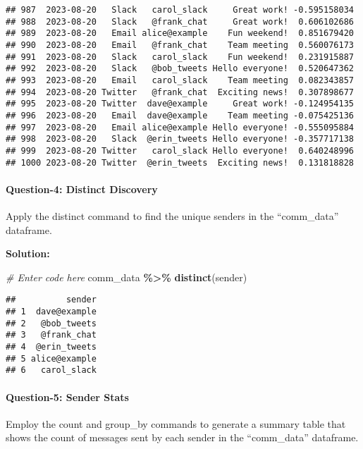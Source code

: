 \documentclass[
]{article}
\newenvironment{Shaded}{\begin{snugshade}}{\end{snugshade}}
\newcommand{\CommentTok}[1]{\textcolor[rgb]{0.56,0.35,0.01}{\textit{#1}}}
\newcommand{\FunctionTok}[1]{\textcolor[rgb]{0.13,0.29,0.53}{\textbf{#1}}}
\newcommand{\NormalTok}[1]{#1}
\newcommand{\SpecialCharTok}[1]{\textcolor[rgb]{0.81,0.36,0.00}{\textbf{#1}}}
\begin{document}
\begin{verbatim}
## 987  2023-08-20   Slack   carol_slack     Great work! -0.595158034
## 988  2023-08-20   Slack   @frank_chat     Great work!  0.606102686
## 989  2023-08-20   Email alice@example    Fun weekend!  0.851679420
## 990  2023-08-20   Email   @frank_chat    Team meeting  0.560076173
## 991  2023-08-20   Slack   carol_slack    Fun weekend!  0.231915887
## 992  2023-08-20   Slack   @bob_tweets Hello everyone!  0.520647362
## 993  2023-08-20   Email   carol_slack    Team meeting  0.082343857
## 994  2023-08-20 Twitter   @frank_chat  Exciting news!  0.307898677
## 995  2023-08-20 Twitter  dave@example     Great work! -0.124954135
## 996  2023-08-20   Email  dave@example    Team meeting -0.075425136
## 997  2023-08-20   Email alice@example Hello everyone! -0.555095884
## 998  2023-08-20   Slack  @erin_tweets Hello everyone! -0.357717138
## 999  2023-08-20 Twitter   carol_slack Hello everyone!  0.640248996
## 1000 2023-08-20 Twitter  @erin_tweets  Exciting news!  0.131818828
\end{verbatim}

\hypertarget{question-4-distinct-discovery}{%
\paragraph{Question-4: Distinct
Discovery}\label{question-4-distinct-discovery}}

Apply the distinct command to find the unique senders in the
``comm\_data'' dataframe.

\textbf{Solution:}

\begin{Shaded}
\begin{Highlighting}[]
\CommentTok{\# Enter code here}
\NormalTok{comm\_data }\SpecialCharTok{\%\textgreater{}\%} \FunctionTok{distinct}\NormalTok{(sender)}
\end{Highlighting}
\end{Shaded}

\begin{verbatim}
##          sender
## 1  dave@example
## 2   @bob_tweets
## 3   @frank_chat
## 4  @erin_tweets
## 5 alice@example
## 6   carol_slack
\end{verbatim}

\hypertarget{question-5-sender-stats}{%
\paragraph{Question-5: Sender Stats}\label{question-5-sender-stats}}

Employ the count and group\_by commands to generate a summary table that
shows the count of messages sent by each sender in the ``comm\_data''
dataframe.
\end{document}

